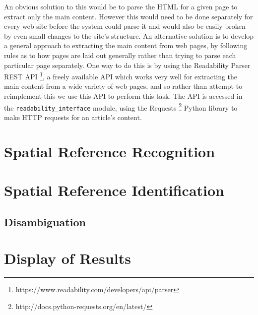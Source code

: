 \documentclass[12pt, a4paper]{report}
\begin{document}
An obvious solution to this would be to parse the HTML for a given page to extract only the main content. However this would need to be done separately for every web site before the system could parse it and would also be easily broken by even small changes to the site's structure. An alternative solution is to develop a general approach to extracting the main content from web pages, by following rules as to how pages are laid out generally rather than trying to parse each particular page separately. One way to do this is by using the Readability Parser REST API \footnote{https://www.readability.com/developers/api/parser}, a freely available API which works very well for extracting the main content from a wide variety of web pages, and so rather than attempt to reimplement this we use this API  to perform this task. The API is accessed in the \verb#readability_interface# module, using the Requests \footnote{http://docs.python-requests.org/en/latest/} Python library to make HTTP requests for an article's content.

\section{Spatial Reference Recognition}




\section{Spatial Reference Identification}


\subsection{Disambiguation}


\section{Display of Results}

\end{document}
